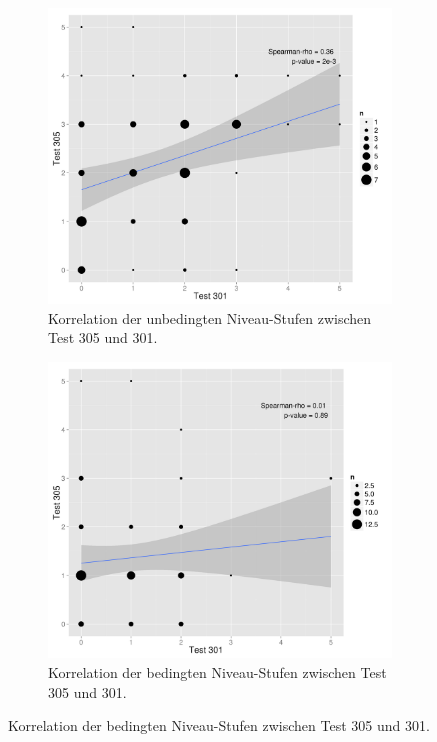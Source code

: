 \begin{figure}[htbp]
\ContinuedFloat %
\centering
\begin{subfigure}{0.49\textwidth}
  \includegraphics[width=1.0\linewidth]{graphics/cor301305u.png}
  \caption{Korrelation der unbedingten Niveau-Stufen zwischen Test 305 und 301.}
  \label{fig:cor301305k}
\end{subfigure}
\begin{subfigure}{0.49\textwidth}
  \includegraphics[width=1.0\linewidth]{graphics/cor301305k.png}
  \caption{Korrelation der bedingten Niveau-Stufen zwischen Test 305 und 301.}
  \label{fig:cor301305u}
\end{subfigure}


\end{figure}
